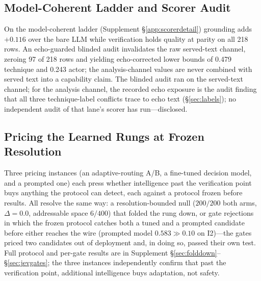 \subsection{Model-Coherent Ladder and Scorer Audit}
\label{sec:scorer-audit}
On the model-coherent ladder (Supplement
\S\ref{app:scorerdetail}) grounding adds $+0.116$ over the bare LLM
while verification holds quality at parity on all 218 rows. An
echo-guarded blinded audit invalidates the raw served-text channel,
zeroing 97 of 218 rows and yielding echo-corrected lower bounds of 0.479
technique and 0.243 actor; the analysis-channel values are never combined
with served text into a capability claim. The blinded audit ran on the
served-text channel; for the analysis channel, the recorded echo exposure is the audit finding that all three
technique-label conflicts trace to echo text (\S\ref{sec:labels}); no
independent audit of that lane's scorer has run---disclosed.

\subsection{Pricing the Learned Rungs at Frozen Resolution}
\label{sec:pricing}
Three pricing instances (an adaptive-routing A/B, a fine-tuned decision
model, and a prompted one) each press whether intelligence past the
verification point buys anything the protocol can detect, each against a
protocol frozen before results. All resolve the same way: a resolution-bounded
null ($200/200$ both arms, $\Delta=0.0$, addressable space $6/400$) that
folded the rung down, or gate rejections in which the frozen protocol catches both a tuned
and a prompted candidate before either reaches the wire (prompted model
$0.583 \gg 0.10$ on I2)---the gates priced two candidates out of
deployment and, in doing so, passed their own test. Full protocol and per-gate results are in
Supplement \S\ref{sec:folddown}--\S\ref{sec:jevgates}; the three
instances independently confirm that past the verification point,
additional intelligence buys adaptation, not safety.

